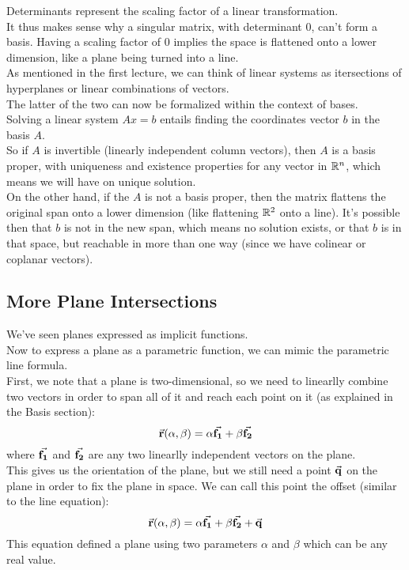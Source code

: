 \documentclass[12pt]{article}
\begin{document}
Determinants represent the scaling factor
of a linear transformation. \\
It thus makes sense why a singular matrix,
with determinant 0,
can't form a basis.
Having a scaling factor of 0 implies
the space is flattened onto a lower dimension,
like a plane being turned into a line. \\

As mentioned in the first lecture,
we can think of linear systems as
itersections of hyperplanes or linear
combinations of vectors. \\
The latter of the two can now be formalized
within the context of bases. \\
Solving a linear system $Ax = b$ entails finding
the coordinates vector $b$
in the basis $A$. \\
So if $A$ is invertible (linearly independent
column vectors),
then $A$ is a basis proper, with uniqueness
and existence properties for any vector in $\mathbb{R}^n$,
which means we will have on unique solution. \\
On the other hand, if the $A$ is not a basis proper,
then the matrix flattens the original span
onto a lower dimension 
(like flattening $\mathbb{R}^2$ onto a line).
It's possible then that $b$ is not in the new
span, which means no solution exists,
or that $b$ is in that space, but reachable
in more than one way (since we have colinear
or coplanar vectors). \\

\newpage

\subsection*{More Plane Intersections}

We've seen planes expressed as implicit
functions. \\
Now to express a plane as a parametric function,
we can mimic the parametric line formula. \\
First, we note that a plane is two-dimensional,
so we need to linearlly combine two vectors
in order to span all of it
and reach each point on it
(as explained in the Basis section):
\[ \vec{\mathbf{r}}(\alpha, \beta) 
= \alpha \vec{\mathbf{f_1}} + \beta \vec{\mathbf{f_2}} \]
where $\vec{\mathbf{f_1}}$ and $\vec{\mathbf{f_2}}$
are any two linearlly independent vectors
on the plane. \\
This gives us the orientation of the plane,
but we still need a point $\vec{\mathbf{q}}$ on the plane
in order to fix the plane in space.
We can call this point the offset
(similar to the line equation):
\[ \vec{\mathbf{r}}(\alpha, \beta) 
= \alpha \vec{\mathbf{f_1}} + \beta \vec{\mathbf{f_2}} + \vec{\mathbf{q}} \]
This equation defined a plane using
two parameters $\alpha$ and $\beta$
which can be any real value. \\
\end{document}
